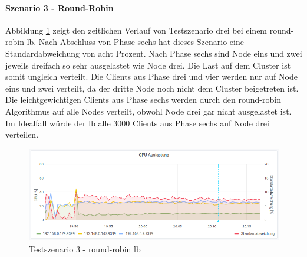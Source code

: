 \paragraph{Szenario 3 - Round-Robin}
Abbildung \ref{fig:s3-rr} zeigt den zeitlichen Verlauf von Testszenario drei bei einem round-robin \ac{lb}.
Nach Abschluss von Phase sechs hat dieses Szenario eine Standardabweichung von acht Prozent.
Nach Phase sechs sind Node eins und zwei jeweils dreifach so sehr ausgelastet wie Node drei. Die Last auf dem Cluster ist somit ungleich verteilt.
Die Clients aus Phase drei und vier werden nur auf Node eins und zwei verteilt, da der dritte Node noch nicht dem Cluster beigetreten ist. Die leichtgewichtigen Clients aus Phase sechs werden durch den round-robin Algorithmus auf alle Nodes verteilt, obwohl Node drei gar nicht ausgelastet ist. Im Idealfall würde der \ac{lb} alle 3000 Clients aus Phase sechs auf Node drei verteilen.
\begin{figure}[h]
    \centering
    \includegraphics[scale=0.8]{images/s3_rr.png}
    \caption{Testszenario 3 - round-robin \acl{lb}}
    \label{fig:s3-rr}
\end{figure}

\newpage

